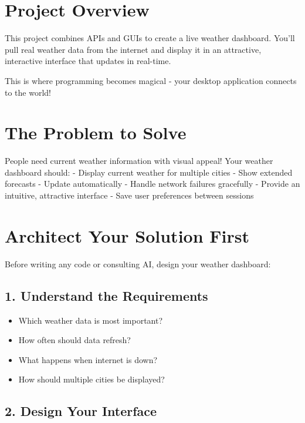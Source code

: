 \documentclass[
  letterpaper,
  DIV=11,
  numbers=noendperiod,
  oneside]{scrreprt}
\providecommand{\tightlist}{%
  \setlength{\itemsep}{0pt}\setlength{\parskip}{0pt}}\usepackage{longtable,booktabs,array}
\begin{document}
\section{Project Overview}\label{project-overview-9}

This project combines APIs and GUIs to create a live weather dashboard.
You'll pull real weather data from the internet and display it in an
attractive, interactive interface that updates in real-time.

This is where programming becomes magical - your desktop application
connects to the world!

\section{The Problem to Solve}\label{the-problem-to-solve-9}

People need current weather information with visual appeal! Your weather
dashboard should: - Display current weather for multiple cities - Show
extended forecasts - Update automatically - Handle network failures
gracefully - Provide an intuitive, attractive interface - Save user
preferences between sessions

\section{Architect Your Solution
First}\label{architect-your-solution-first-9}

Before writing any code or consulting AI, design your weather dashboard:

\subsection{1. Understand the
Requirements}\label{understand-the-requirements}

\begin{itemize}
\tightlist
\item
  Which weather data is most important?
\item
  How often should data refresh?
\item
  What happens when internet is down?
\item
  How should multiple cities be displayed?
\end{itemize}

\subsection{2. Design Your Interface}\label{design-your-interface}
\end{document}
